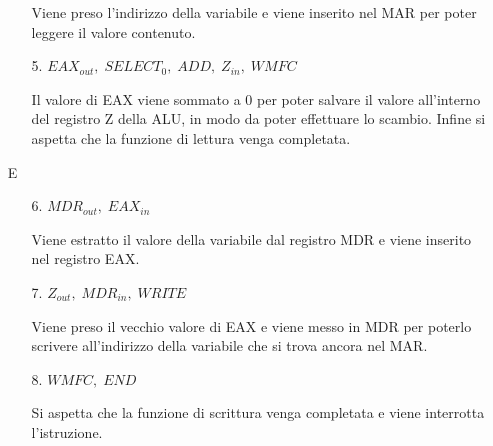 \documentclass[a4paper]{article}
\theoremstyle{break}
\theoremstyle{break}
\theoremstyle{break}
\theoremstyle{break}
\begin{document}
\begin{exercise}
\begin{enumerate}
\begin{enumerate}
          \noindent Viene preso l'indirizzo della variabile e viene inserito nel MAR
          per poter leggere il valore contenuto.
        \item [5.] \( EAX_{out},\; SELECT_0,\; ADD,\; Z_{in},\; WMFC \)

          \noindent Il valore di EAX viene sommato a 0 per poter salvare il valore
          all'interno del registro Z della ALU, in modo da poter effettuare lo scambio.
          Infine si aspetta che la funzione di lettura venga completata.
      \end{enumerate}
    \item [E]
      \begin{enumerate}
        \item [6.] \( MDR_{out},\; EAX_{in} \) 

          \noindent Viene estratto il valore della variabile dal registro MDR e viene
          inserito nel registro EAX.
        \item [7.] \( Z_{out},\; MDR_{in},\; WRITE \) 

          \noindent Viene preso il vecchio valore di EAX e viene messo in MDR per poterlo
          scrivere all'indirizzo della variabile che si trova ancora nel MAR.
        \item [8.] \( WMFC,\; END \) 

          \noindent Si aspetta che la funzione di scrittura venga completata e viene
          interrotta l'istruzione.
      \end{enumerate}
  \end{enumerate}
\end{exercise}
\end{document}
